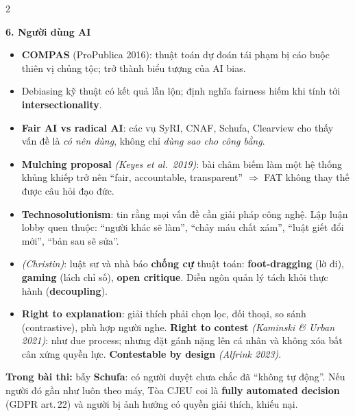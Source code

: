 \documentclass[10pt]{article}
\newcommand{\kw}[1]{\textbf{#1}}
\newcommand{\ct}[1]{{\color{h1}\itshape(#1)}}
\newcommand{\sect}[1]{\par\vspace{6pt}\noindent\colorbox{h1}{\parbox{\dimexpr\linewidth-2\fboxsep}{\large\bfseries\color{white}#1}}\par\vspace{2pt}}
\newcommand{\warn}[1]{\par\noindent\colorbox{wn}{\parbox{\dimexpr\linewidth-2\fboxsep}{\textbf{Trong bài thi:} #1}}\par}
\begin{document}
\begin{multicols}{2}
\sect{6. Người dùng AI}
\begin{itemize}
\item \kw{COMPAS} (ProPublica 2016): thuật toán dự đoán tái phạm bị cáo buộc thiên vị chủng tộc; trở thành biểu tượng của AI bias.
\item Debiasing kỹ thuật có kết quả lẫn lộn; định nghĩa fairness hiếm khi tính tới \kw{intersectionality}.
\item \kw{Fair AI vs radical AI}: các vụ SyRI, CNAF, Schufa, Clearview cho thấy vấn đề là \emph{có nên dùng}, không chỉ \emph{dùng sao cho công bằng}.
\item \kw{Mulching proposal} \ct{Keyes et al.\ 2019}: bài châm biếm làm một hệ thống khủng khiếp trở nên ``fair, accountable, transparent'' $\Rightarrow$ FAT không thay thế được câu hỏi đạo đức.
\item \kw{Technosolutionism}: tin rằng mọi vấn đề cần giải pháp công nghệ. Lập luận lobby quen thuộc: ``người khác sẽ làm'', ``chảy máu chất xám'', ``luật giết đổi mới'', ``bản sau sẽ sửa''.
\item \ct{Christin}: luật sư và nhà báo \kw{chống cự} thuật toán: \kw{foot-dragging} (lờ đi), \kw{gaming} (lách chỉ số), \kw{open critique}. Diễn ngôn quản lý tách khỏi thực hành (\kw{decoupling}).
\item \kw{Right to explanation}: giải thích phải chọn lọc, đối thoại, so sánh (contrastive), phù hợp người nghe. \kw{Right to contest} \ct{Kaminski \& Urban 2021}: như due process; nhưng đặt gánh nặng lên cá nhân và không xóa bất cân xứng quyền lực. \kw{Contestable by design} \ct{Alfrink 2023}.
\end{itemize}
\warn{bẫy \kw{Schufa}: có người duyệt chưa chắc đã ``không tự động''. Nếu người đó gần như luôn theo máy, Tòa CJEU coi là \kw{fully automated decision} (GDPR art.\,22) và người bị ảnh hưởng có quyền giải thích, khiếu nại.}


\end{multicols}
\end{document}
